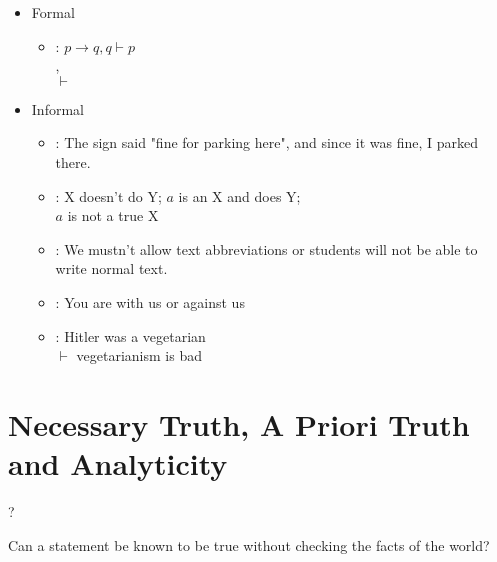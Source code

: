 \documentclass[headrule,footrule]{foils}
\begin{document}
\begin{itemize}
\item Formal
  \begin{itemize}
  \item {}: $p \rightarrow q, q \vdash p$
    \\ , 
    \\ $\vdash$ 
  \end{itemize}
\item Informal
  \begin{itemize}
  \item {}:  The sign said "fine for parking here", and since it was fine, I parked there. 
  \item {}: X doesn't do Y; $a$ is an X and does Y;
    \\ $a$ is not a true X
  \item {}: We mustn't allow text abbreviations or students will not be able to write normal text.
  \item {}: You are with us or against us
  \item {}: Hitler was a vegetarian \\
    $\vdash$ vegetarianism is bad
  \end{itemize}
\end{itemize}



\section{Necessary Truth, A Priori Truth and Analyticity}

\begin{exe}
  \ex {}
  \ex ?
\end{exe}

\noindent Can a statement be known to be true without checking the facts of the
world?
\end{document}
